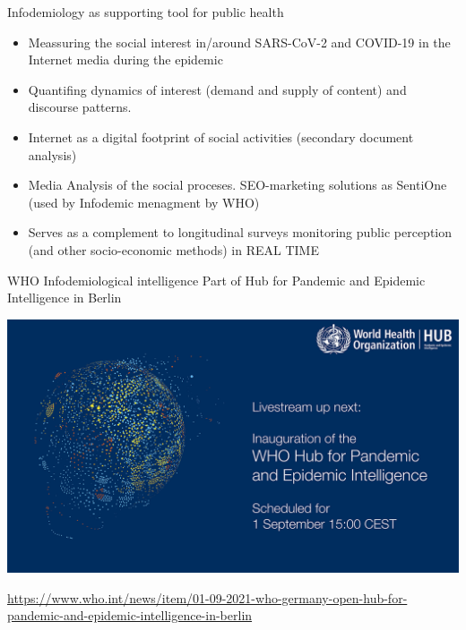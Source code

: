 \documentclass[
  10pt,
  ignorenonframetext,
  a4paper,handout]{beamer}
\begin{document}
\begin{frame}{Infodemiology as supporting tool for public health}
\protect\hypertarget{infodemiology-as-supporting-tool-for-public-health}{}
\begin{itemize}
\item
  Meassuring the social interest in/around SARS-CoV-2 and COVID-19 in
  the Internet media during the epidemic
\item
  Quantifing dynamics of interest (demand and supply of content) and
  discourse patterns.
\item
  Internet as a digital footprint of social activities (secondary
  document analysis)
\item
  Media Analysis of the social proceses. SEO-marketing solutions as
  SentiOne (used by Infodemic menagment by WHO)
\item
  Serves as a complement to longitudinal surveys monitoring public
  perception (and other socio-economic methods) in REAL TIME
\end{itemize}
\end{frame}

\begin{frame}{WHO Infodemiological intelligence}
\protect\hypertarget{who-infodemiological-intelligence}{}
Part of Hub for Pandemic and Epidemic Intelligence in Berlin

\begin{center}\includegraphics[width=0.7\linewidth]{who_20210901_101_en} \end{center}

\url{https://www.who.int/news/item/01-09-2021-who-germany-open-hub-for-pandemic-and-epidemic-intelligence-in-berlin}
\end{frame}
\end{document}
